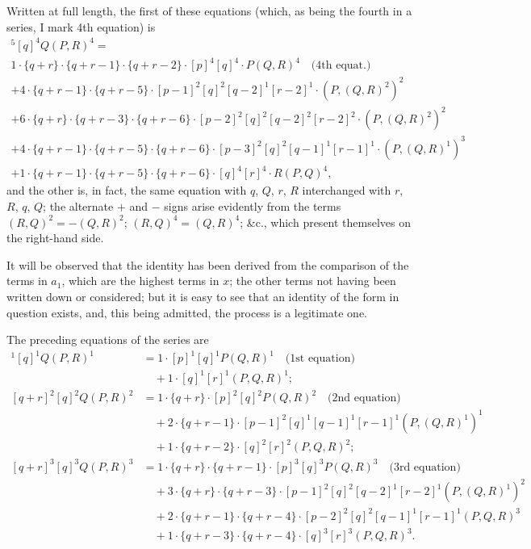 \documentclass[12pt,a4paper]{article}
\theoremstyle{cayley}
\theoremstyle{definition}
\numberwithin{equation}{section}
\begin{document}
Written at full length, the first of these equations (which, as being the fourth in a series, I mark 4th equation) is
\begin{multline*}
[q + r]^5 [q]^4 Q(P, R)^4 = \\
1 \cdot \{q + r\} \cdot \{q + r - 1\} \cdot \{q + r - 2\} \cdot [p]^4 [q]^4 \cdot P(Q, R)^4 \quad \text{(4th equat.)} \\
+ 4 \cdot \{q + r - 1\} \cdot \{q + r - 5\} \cdot [p - 1]^2 [q]^2 [q - 2]^1 [r - 2]^1 \cdot (P, (Q, R)^2)^2 \\
+ 6 \cdot \{q + r\} \cdot \{q + r - 3\} \cdot \{q + r - 6\} \cdot [p - 2]^2 [q]^2 [q - 2]^2 [r - 2]^2 \cdot (P, (Q, R)^2)^2 \\
+ 4 \cdot \{q + r - 1\} \cdot \{q + r - 5\} \cdot \{q + r - 6\} \cdot [p - 3]^2 [q]^2 [q - 1]^1 [r - 1]^1 \cdot (P, (Q, R)^1)^3 \\
+ 1 \cdot \{q + r - 1\} \cdot \{q + r - 5\} \cdot \{q + r - 6\} \cdot [q]^4 [r]^4 \cdot R(P, Q)^4,
\end{multline*}
and the other is, in fact, the same equation with $q$, $Q$, $r$, $R$ interchanged with $r$, $R$, $q$, $Q$; the alternate $+$ and $-$ signs arise evidently from the terms $(R, Q)^2 = -(Q, R)^2$; $(R, Q)^4 = (Q, R)^4$; \&c., which present themselves on the right-hand side.

It will be observed that the identity has been derived from the comparison of the terms in $a_1$, which are the highest terms in $x$; the other terms not having been written down or considered; but it is easy to see that an identity of the form in question exists, and, this being admitted, the process is a legitimate one.

The preceding equations of the series are
\begin{align*}
[q + r]^1 [q]^1 Q(P, R)^1 &= 1 \cdot [p]^1 [q]^1 P(Q, R)^1 \quad \text{(1st equation)} \\
&\quad + 1 \cdot [q]^1 [r]^1 (P, Q, R)^1; \\
[q + r]^2 [q]^2 Q(P, R)^2 &= 1 \cdot \{q + r\} \cdot [p]^2 [q]^2 P(Q, R)^2 \quad \text{(2nd equation)} \\
&\quad + 2 \cdot \{q + r - 1\} \cdot [p - 1]^2 [q]^1 [q - 1]^1 [r - 1]^1 (P, (Q, R)^1)^1 \\
&\quad + 1 \cdot \{q + r - 2\} \cdot [q]^2 [r]^2 (P, Q, R)^2; \\
[q + r]^3 [q]^3 Q(P, R)^3 &= 1 \cdot \{q + r\} \cdot \{q + r - 1\} \cdot [p]^3 [q]^3 P(Q, R)^3 \quad \text{(3rd equation)} \\
&\quad + 3 \cdot \{q + r\} \cdot \{q + r - 3\} \cdot [p - 1]^2 [q]^2 [q - 2]^1 [r - 2]^1 (P, (Q, R)^1)^2 \\
&\quad + 2 \cdot \{q + r - 1\} \cdot \{q + r - 4\} \cdot [p - 2]^2 [q]^2 [q - 1]^1 [r - 1]^1 (P, Q, R)^3 \\
&\quad + 1 \cdot \{q + r - 3\} \cdot \{q + r - 4\} \cdot [q]^3 [r]^3 (P, Q, R)^3.
\end{align*}
\end{document}
